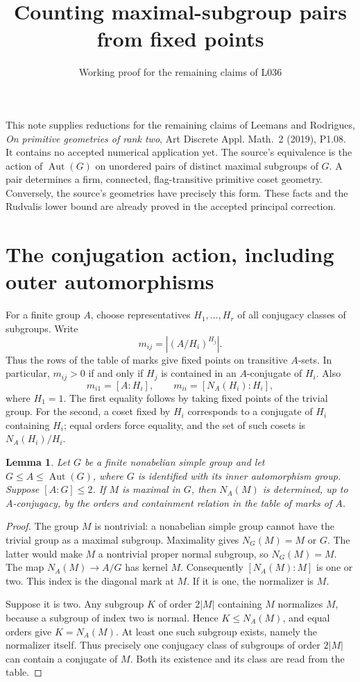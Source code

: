 \documentclass[11pt]{article}
\title{Counting maximal-subgroup pairs from fixed points}
\author{Working proof for the remaining claims of L036}
\date{}
\newtheorem{lemma}[theorem]{Lemma}
\newcommand{\Aut}{\operatorname{Aut}}
\begin{document}
\maketitle
This note supplies reductions for the remaining claims of Leemans and
Rodrigues, \emph{On primitive geometries of rank two}, Art Discrete Appl.
Math.\ 2 (2019), P1.08. It contains no accepted numerical application yet.
The source's equivalence is the action of $\Aut(G)$ on unordered pairs of
distinct maximal subgroups of $G$. A pair determines a firm, connected,
flag-transitive primitive coset geometry. Conversely, the source's
geometries have precisely this form. These facts and the Rudvalis lower
bound are already proved in the accepted principal correction.

\section{The conjugation action, including outer automorphisms}
For a finite group $A$, choose representatives $H_1,\ldots,H_r$ of all
conjugacy classes of subgroups. Write
\[
 m_{ij}=|(A/H_i)^{H_j}|.
\]
Thus the rows of the table of marks give fixed points on transitive
$A$-sets. In particular, $m_{ij}>0$ if and only if $H_j$ is contained
in an $A$-conjugate of $H_i$. Also
\[
 m_{i1}=[A:H_i],\qquad m_{ii}=[N_A(H_i):H_i],
\]
where $H_1=1$. The first equality follows by taking fixed points of the
trivial group. For the second, a coset fixed by $H_i$ corresponds to a
conjugate of $H_i$ containing $H_i$; equal orders force equality, and
the set of such cosets is $N_A(H_i)/H_i$.

\begin{lemma}\label{normalizer}
Let $G$ be a finite nonabelian simple group and let
$G\leq A\leq\Aut(G)$, where $G$ is identified with its inner
 automorphism group. Suppose $[A:G]\leq2$. If $M$ is maximal in $G$,
then $N_A(M)$ is determined, up to $A$-conjugacy, by the orders and
containment relation in the table of marks of $A$.
\end{lemma}
\begin{proof}
The group $M$ is nontrivial: a nonabelian simple group cannot have the
trivial group as a maximal subgroup. Maximality gives $N_G(M)=M$ or
$G$. The latter would make $M$ a nontrivial proper normal subgroup,
so $N_G(M)=M$. The map $N_A(M)\to A/G$ has kernel $M$. Consequently
$[N_A(M):M]$ is one or two. This index is the diagonal mark at $M$.
If it is one, the normalizer is $M$.

Suppose it is two. Any subgroup $K$ of order $2|M|$ containing $M$
normalizes $M$, because a subgroup of index two is normal. Hence
$K\leq N_A(M)$, and equal orders give $K=N_A(M)$. At least one such
subgroup exists, namely the normalizer itself. Thus precisely one
conjugacy class of subgroups of order $2|M|$ can contain a conjugate
of $M$. Both its existence and its class are read from the table.
\end{proof}
\end{document}
